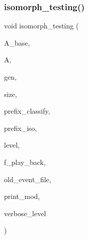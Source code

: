 \subsubsection{\texorpdfstring{isomorph\+\_\+testing()}{isomorph\_testing()}}
{\footnotesize\ttfamily void isomorph\+\_\+testing (\begin{DoxyParamCaption}\item[{\mbox{\hyperlink{classaction}{action}} $\ast$}]{A\+\_\+base,  }\item[{\mbox{\hyperlink{classaction}{action}} $\ast$}]{A,  }\item[{\mbox{\hyperlink{classgenerator}{generator}} $\ast$}]{gen,  }\item[{\mbox{\hyperlink{galois_8h_a09fddde158a3a20bd2dcadb609de11dc}{I\+NT}}}]{size,  }\item[{const \mbox{\hyperlink{galois_8h_ab6cc7b4aeb6ea31aba2b3fbfc83ff5e6}{B\+Y\+TE}} $\ast$}]{prefix\+\_\+classify,  }\item[{const \mbox{\hyperlink{galois_8h_ab6cc7b4aeb6ea31aba2b3fbfc83ff5e6}{B\+Y\+TE}} $\ast$}]{prefix\+\_\+iso,  }\item[{\mbox{\hyperlink{galois_8h_a09fddde158a3a20bd2dcadb609de11dc}{I\+NT}}}]{level,  }\item[{\mbox{\hyperlink{galois_8h_a09fddde158a3a20bd2dcadb609de11dc}{I\+NT}}}]{f\+\_\+play\+\_\+back,  }\item[{const \mbox{\hyperlink{galois_8h_ab6cc7b4aeb6ea31aba2b3fbfc83ff5e6}{B\+Y\+TE}} $\ast$}]{old\+\_\+event\+\_\+file,  }\item[{\mbox{\hyperlink{galois_8h_a09fddde158a3a20bd2dcadb609de11dc}{I\+NT}}}]{print\+\_\+mod,  }\item[{\mbox{\hyperlink{galois_8h_a09fddde158a3a20bd2dcadb609de11dc}{I\+NT}}}]{verbose\+\_\+level }\end{DoxyParamCaption})}

\mbox{\label{isomorph__global_8_c_ace3bb6ec719b02a35534309d4d3fe99a}} 
